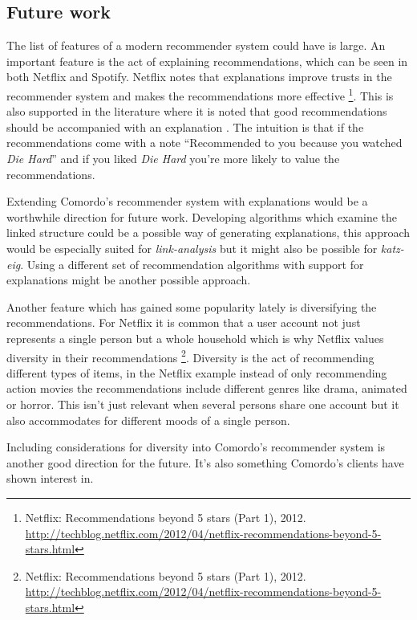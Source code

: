 
\subsection{Future work}

The list of features of a modern recommender system could have is large. An important feature is the act of explaining recommendations, which can be seen in both Netflix and Spotify. Netflix notes that explanations improve trusts in the recommender system and makes the recommendations more effective \footnote{
Netflix: Recommendations beyond 5 stars (Part 1), 2012.
\url{http://techblog.netflix.com/2012/04/netflix-recommendations-beyond-5-stars.html}
}.
This is also supported in the literature where it is noted that good recommendations should be accompanied with an explanation \citep{hu2008collaborative}.
The intuition is that if the recommendations come with a note ``Recommended to you because you watched \textit{Die Hard}'' and if you liked \textit{Die Hard} you're more likely to value the recommendations.

Extending Comordo's recommender system with explanations would be a worthwhile direction for future work. Developing algorithms which examine the linked structure could be a possible way of generating explanations, this approach would be especially suited for \textit{link-analysis} but it might also be possible for \textit{katz-eig}. Using a different set of recommendation algorithms with support for explanations \citep{hu2008collaborative} might be another possible approach.

Another feature which has gained some popularity lately \citep{bobadilla2013recommender} is diversifying the recommendations. For Netflix it is common that a user account not just represents a single person but a whole household which is why Netflix values diversity in their recommendations
\footnote{
Netflix: Recommendations beyond 5 stars (Part 1), 2012.
\url{http://techblog.netflix.com/2012/04/netflix-recommendations-beyond-5-stars.html}
}.
Diversity is the act of recommending different types of items, in the Netflix example instead of only recommending action movies the recommendations include different genres like drama, animated or horror. This isn't just relevant when several persons share one account but it also accommodates for different moods of a single person.

Including considerations for diversity into Comordo's recommender system is another good direction for the future. It's also something Comordo's clients have shown interest in.

